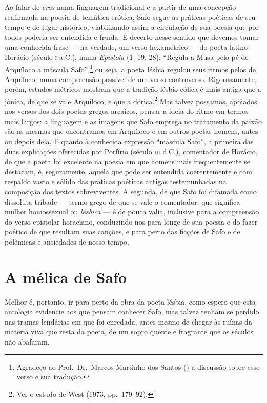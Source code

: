 Ao falar de \textit{éros} numa linguagem tradicional e a partir de uma concepção
reafirmada na poesia de temática erótica, Safo segue as práticas poéticas de
seu tempo e de lugar histórico, viabilizando assim a circulação de sua poesia
que por todos poderia ser entendida e fruída. É decerto nesse sentido que
devemos tomar uma conhecida frase --- na verdade, um verso hexamétrico --- do poeta
latino Horácio (século \textsc{i} a.C.), numa \textit{Epístola} (1. 19. 28):
``Regula a Musa pelo pé de Arquíloco a máscula Safo”,\footnote{ Agradeço
ao Prof.~Dr.~Marcos Martinho dos Santos () a discussão sobre esse verso e
sua tradução.} ou seja, a poeta lésbia regulou seus ritmos pelos de Arquíloco,
numa compreensão possível de um verso controverso. Rigorosamente, porém,
estudos métricos mostram que a tradição lésbio-eólica é mais antiga que a
jônica, de que se vale Arquíloco, e que a dórica.\footnote{ Ver o estudo de West
(1973, pp.~179--92).} Mas talvez possamos, apoiados nos versos dos dois poetas
gregos arcaicos, pensar a ideia do ritmo em termos mais largos: a linguagem e
as imagens que Safo emprega no tratamento da paixão são as mesmas que
encontramos em Arquíloco e em outros poetas homens, antes ou depois dela. E
quanto à conhecida expressão ``máscula Safo”, a primeira das duas
explicações oferecidas por Porfírio (século \textsc{iii} d.C.), comentador de Horácio,
de que a poeta foi excelente na poesia em que homens mais frequentemente se
destacam, é, seguramente, aquela que pode ser entendida coerentemente e com
respaldo vasto e sólido das práticas poéticas antigas testemunhadas na
composição dos textos sobreviventes. A segunda, de que Safo foi difamada como
dissoluta tríbade --- termo grego de que se vale o comentador, que significa
mulher homossexual ou \textit{lésbica} --- é de pouca valia, inclusive para a
compreensão do verso epistolar horaciano, conduzindo-nos para longe de sua
poesia e do fazer poético de que resultam suas canções, e para perto das
ficções de Safo e de polêmicas e ansiedades de nosso tempo. 


\section{A mélica de Safo}

Melhor é, portanto, ir para perto da obra da poeta lésbia, como espero que esta
antologia evidencie aos que pensam conhecer Safo, mas talvez tenham se perdido
nas tramas lendárias em que foi enredada, antes mesmo de chegar às ruínas da
matéria viva que resta da poeta, de um sopro quente e fragrante que os séculos
não abafaram.

